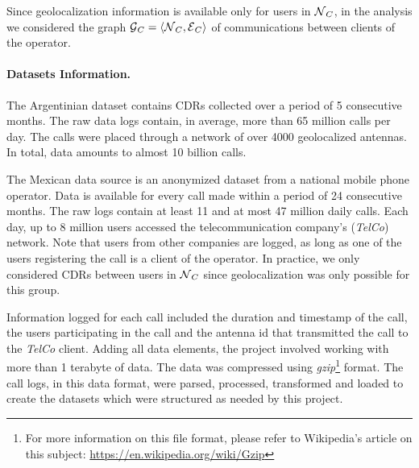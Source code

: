 Since geolocalization information is available only for users in $\operatorname{\mathcal{N}}_C$, in the analysis we considered the graph $\operatorname{\mathcal{G}}_C = \left< \operatorname{\mathcal{N}}_C, \operatorname{\mathcal{E}}_C \right>$ of communications between clients of the operator.

\paragraph{Datasets Information.}

The Argentinian dataset contains CDRs collected over a period of 5 consecutive months.
The raw data logs contain, in average, more than 65 million calls per day.
The calls were placed through a network of over 4000 geolocalized antennas.
In total, data amounts to almost 10 billion calls.

The Mexican data source is an anonymized dataset from a national mobile phone operator.
Data is available for every call made within a period of 24 consecutive months.
The raw logs contain at least 11 and at most 47 million daily calls.
Each day, up to 8 million users accessed the telecommunication company's (\textit{TelCo}) network.
Note that users from other companies are logged, as long as one of the users registering the call is a client of the operator.
In practice, we only considered CDRs between users in $\operatorname{\mathcal{N}}_C$ since geolocalization was only possible for this group.

Information logged for each call included the duration and timestamp of the call, the users participating in the call and the antenna id that transmitted the call to the \emph{TelCo} client.
Adding all data elements, the project involved working with more than 1 terabyte of data.
The data was compressed using \emph{gzip}\footnote{For more information on this file format, please refer to Wikipedia's article on this subject: \url{https://en.wikipedia.org/wiki/Gzip}} format.
The call logs, in this data format, were parsed, processed, transformed and loaded to create the datasets which were structured as needed by this project.

